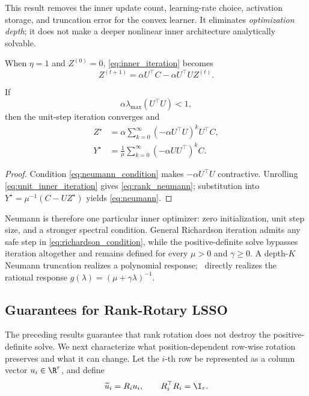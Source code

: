 This result removes the inner update count, learning-rate choice, activation
storage, and truncation error for the convex learner. It eliminates
\emph{optimization depth}; it does not make a deeper nonlinear inner
architecture analytically solvable.

When $\eta=1$ and $Z^{(0)}=0$, \cref{eq:inner_iteration} becomes
\begin{equation}
  Z^{(t+1)}
  =\alpha U^\top C-\alpha U^\top UZ^{(t)}.
  \label{eq:unit_inner_iteration}
\end{equation}

\begin{proposition}
\label{prop:neumann}
If
\begin{equation}
  \alpha\lambda_{\max}(U^\top U)<1,
  \label{eq:neumann_condition}
\end{equation}
then the unit-step iteration converges and
\begin{align}
  Z^\star
  &=\alpha\sum_{k=0}^{\infty}
    (-\alpha U^\top U)^kU^\top C,
    \label{eq:rank_neumann}\\
  Y^\star
  &=\frac{1}{\mu}
    \sum_{k=0}^{\infty}(-\alpha UU^\top)^kC.
    \label{eq:neumann}
\end{align}
\end{proposition}
\begin{proof}
Condition \cref{eq:neumann_condition} makes
$-\alpha U^\top U$ contractive. Unrolling
\cref{eq:unit_inner_iteration} gives \cref{eq:rank_neumann}; substitution into
$Y^\star=\mu^{-1}(C-UZ^\star)$ yields \cref{eq:neumann}.
\end{proof}

Neumann is therefore one particular inner optimizer: zero initialization,
unit step size, and a stronger spectral condition. General Richardson
iteration admits any safe step in \cref{eq:richardson_condition}, while the
positive-definite solve bypasses iteration altogether and remains defined for
every $\mu>0$ and $\gamma\geq0$. A depth-$K$ Neumann truncation realizes a
polynomial response; \LSSO\ directly realizes the rational response
$g(\lambda)=(\mu+\gamma\lambda)^{-1}$.

\subsection{Guarantees for Rank-Rotary LSSO}

The preceding results guarantee that rank rotation does not destroy the
positive-definite solve. We next characterize what position-dependent
row-wise rotation preserves and what it can change. Let the $i$-th row be
represented as a column vector $u_i\in\R^r$, and define
\begin{equation}
  \widetilde u_i=R_i u_i,
  \qquad R_i^\top R_i=\I_r.
  \label{eq:rowwise_rotation}
\end{equation}

